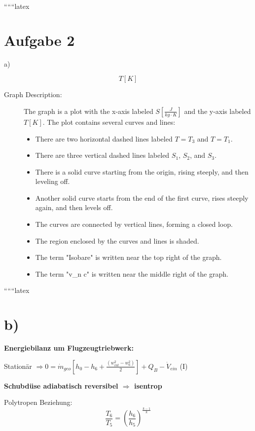 
``````latex


\section*{Aufgabe 2}
a)

\[
T \left[ K \right]
\]

\begin{description}
    \item[Graph Description:] The graph is a plot with the x-axis labeled \( S \left[ \frac{J}{kg \cdot K} \right] \) and the y-axis labeled \( T \left[ K \right] \). The plot contains several curves and lines:
    \begin{itemize}
        \item There are two horizontal dashed lines labeled \( T = T_3 \) and \( T = T_1 \).
        \item There are three vertical dashed lines labeled \( S_1 \), \( S_2 \), and \( S_3 \).
        \item There is a solid curve starting from the origin, rising steeply, and then leveling off.
        \item Another solid curve starts from the end of the first curve, rises steeply again, and then levels off.
        \item The curves are connected by vertical lines, forming a closed loop.
        \item The region enclosed by the curves and lines is shaded.
        \item The term "Isobare" is written near the top right of the graph.
        \item The term "v_n c" is written near the middle right of the graph.
    \end{itemize}
\end{description}

``````latex


\section*{b)}

\textbf{Energiebilanz um Flugzeugtriebwerk:}

Stationär $\Rightarrow 0 = \dot{m}_{geo} \left[ h_0 - h_6 + \frac{(w_{int}^2 - w_6^2)}{2} \right] + Q_B - \dot{V}_{ein}$ \hfill (I)

\textbf{Schubdüse adiabatisch reversibel $\Rightarrow$ isentrop}

Polytropen Beziehung:
\[
\frac{T_6}{T_5} = \left( \frac{h_6}{h_5} \right)^{\frac{k-1}{k}}
\]

